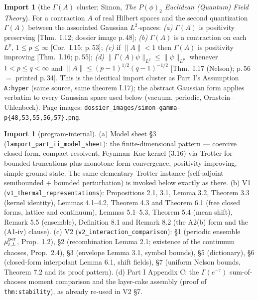 \documentclass[11pt,a4paper]{article}
\theoremstyle{plain}
\theoremstyle{definition}
\newtheorem{importx}[theorem]{Import}
\newcommand{\Gam}{\Gamma}
\begin{document}
\begin{importx}[the $\Gam(A)$ cluster; Simon,
\emph{The $P(\phi)_2$ Euclidean (Quantum) Field Theory}]\label{imp:gamma}
For a contraction $A$ of real Hilbert spaces and the second quantization
$\Gam(A)$ between the associated Gaussian $L^2$-spaces:
\emph{(a)} $\Gam(A)$ is positivity preserving [Thm.\ I.12; dossier image
p.\,48];
\emph{(b)} $\Gam(A)$ is a contraction on each $L^p$, $1\le p\le\infty$
[Cor.\ I.15; p.\,53];
\emph{(c)} if $\|A\|<1$ then $\Gam(A)$ is positivity improving
[Thm.\ I.16; p.\,55];
\emph{(d)} $\|\Gam(A)\psi\|_{L^q}\le\|\psi\|_{L^p}$ whenever $1<p\le
q<\infty$ and $\|A\|\le(p-1)^{1/2}(q-1)^{-1/2}$ [Thm.\ I.17 (Nelson);
p.\,56 $=$ printed p.\,34].
This is the identical import cluster as Part I's Assumption
\texttt{A:hyper} (same source, same theorem I.17); the abstract Gaussian
form applies verbatim to every Gaussian space used below (vacuum, periodic,
Ornstein--Uhlenbeck). Page images: \texttt{dossier\_images/simon-gamma-p\{48,53,55,56,57\}.png}.
\end{importx}

\begin{importx}[program-internal]\label{imp:internal}
(a) Model sheet \S3 (\texttt{lamport\_part\_ii\_model\_sheet}): the
finite-dimensional pattern --- coercive closed form, compact resolvent,
Feynman--Kac kernel (3.16) via Trotter for bounded truncations plus
monotone form convergence, positivity improving, simple ground state. The
same elementary Trotter instance (self-adjoint semibounded $+$ bounded
perturbation) is invoked below exactly as there.
(b) V1 (\texttt{v1\_thermal\_}\allowbreak\texttt{representations}): Propositions 2.1, 3.1,
Lemma 3.2, Theorem 3.3 (kernel identity), Lemmas 4.1--4.2, Theorem 4.3
and Theorem 6.1 (free closed forms, lattice and continuum), Lemmas 5.1--5.3,
Theorem 5.4 (mean shift), Remark 5.5 (ensemble), Definition 8.1 and Remark
8.2 (the A2(b) form and the (A1-iv) clause).
(c) V2 (\texttt{v2\_interaction\_comparison}): \S1 (periodic ensemble
$\mu^{\rm per}_{t,L}$, Prop.\ 1.2), \S2 (recombination Lemma 2.1;
existence of the continuum chaoses, Prop.\ 2.4), \S3 (envelope Lemma 3.1,
symbol bounds), \S5 (dictionary), \S6 (closed-form interpolant Lemma 6.1,
shift fields), \S7 (uniform Nelson bounds, Theorem 7.2 and its proof
pattern).
(d) Part I Appendix C: the $\Gam(e^{-\tau})$ sum-of-chaoses moment
comparison and the layer-cake assembly (proof of \texttt{thm:stability}),
as already re-used in V2 \S7.
\end{importx}
\end{document}
